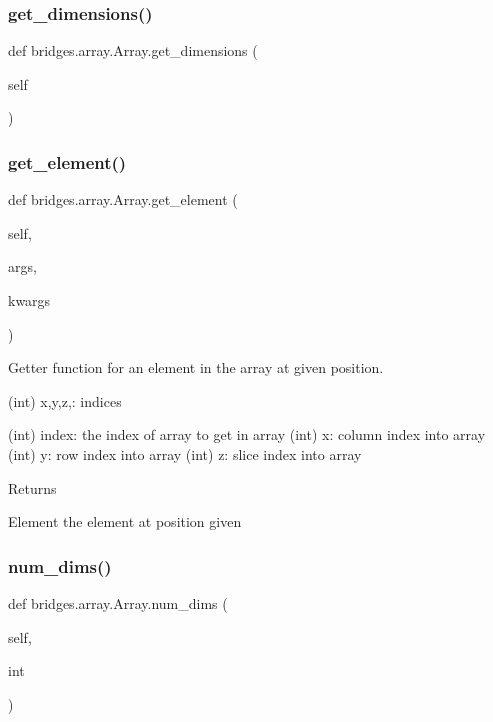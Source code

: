 \subsubsection{\texorpdfstring{get\+\_\+dimensions()}{get\_dimensions()}}
{\footnotesize\ttfamily def bridges.\+array.\+Array.\+get\+\_\+dimensions (\begin{DoxyParamCaption}\item[{}]{self }\end{DoxyParamCaption})}

\mbox{\label{classbridges_1_1array_1_1_array_ae02a649c2d9a1b830b36650d5a308105}} 
\subsubsection{\texorpdfstring{get\+\_\+element()}{get\_element()}}
{\footnotesize\ttfamily def bridges.\+array.\+Array.\+get\+\_\+element (\begin{DoxyParamCaption}\item[{}]{self,  }\item[{}]{args,  }\item[{}]{kwargs }\end{DoxyParamCaption})}



Getter function for an element in the array at given position. 

(int) x,y,z,\+: indices

(int) index\+: the index of array to get in array (int) x\+: column index into array (int) y\+: row index into array (int) z\+: slice index into array \begin{DoxyReturn}{Returns}


Element the element at position given 
\end{DoxyReturn}
\mbox{\label{classbridges_1_1array_1_1_array_aaef2013f0e3befd61c0497638f409bc8}} 
\subsubsection{\texorpdfstring{num\+\_\+dims()}{num\_dims()}\hspace{0.1cm}{\footnotesize\ttfamily [1/2]}}
{\footnotesize\ttfamily def bridges.\+array.\+Array.\+num\+\_\+dims (\begin{DoxyParamCaption}\item[{}]{self,  }\item[{}]{int }\end{DoxyParamCaption})}



